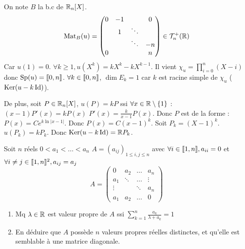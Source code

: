 \begin{solution}
On note $B$ la b.c de $\mathbb R_n[X]$.
\[
\operatorname{Mat}_B(u) =
\begin{pmatrix}
0 & -1 & & 0 \\
& 1 & \ddots & \\
& & \ddots & -n \\
0 & & & n
\end{pmatrix} \in \mathcal{T}_n^+(\mathbb R)
\]
Car $u(1) = 0$.
$\forall k \geq 1, u(X^k) = k X^k - k X^{k-1}$.
Il vient $\chi_u = \prod_{i=0}^n (X-i)$ donc $\operatorname{Sp}(u) = \llbracket 0,n\rrbracket$.
$\forall k \in \llbracket 0,n\rrbracket$, $\dim E_k = 1$ car $k$ est racine simple de $\chi_u$ ($\operatorname{Ker}(u - k \operatorname{Id})$).

De plus, soit $P \in \mathbb R_n[X]$, $u(P) = kP$ ssi $\forall x \in \mathbb R \setminus \{1\}$ :
$(x-1)P'(x) = k P(x)$
$P'(x) = \frac{k}{x-1} P(x)$.
Donc $P$ est de la forme : $P(x) = C e^{k \ln|x-1|}$.
Donc $P(x) = C (x-1)^k$.
Soit $P_k = (X-1)^k$.
$u(P_k) = k P_k$.
Donc $\operatorname{Ker}(u - k \operatorname{Id}) = \mathbb R P_k$.
\end{solution}


\begin{statementbox}
Soit $n$ réels $0 < a_1 < \dots < a_n$
$A = (a_{ij})_{1 \leq i,j \leq n}$ avec $\forall i \in \llbracket 1,n\rrbracket, a_{ii} = 0$ et $\forall i \neq j \in \llbracket 1,n\rrbracket^2, a_{ij} = a_j$
\[
A = \begin{pmatrix} 0 & a_2 & \dots & a_n \\ a_1 & \ddots & \dots & \vdots \\ \vdots & & \ddots & a_n \\ a_1 & a_2 & \dots & 0 \end{pmatrix}
\]
\begin{enumerate}[label=\alph*)]
  \item Mq $\lambda \in \mathbb R$ est valeur propre de $A$ ssi $\sum_{k=1}^n \frac{a_k}{\lambda + a_k} = 1$
  \item En déduire que $A$ possède $n$ valeurs propres réelles distinctes, et qu'elle est semblable à une matrice diagonale.
\end{enumerate}
\end{statementbox}

